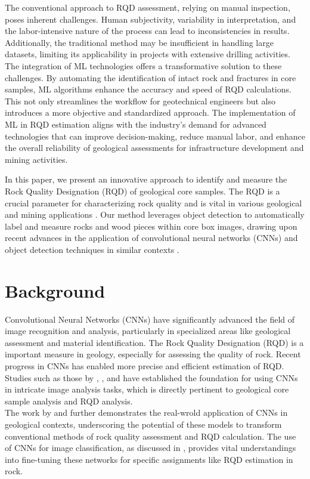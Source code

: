 \documentclass[sigconf,authordraft]{acmart}
\begin{document}
The conventional approach to RQD assessment, relying on manual inspection, poses inherent challenges. Human subjectivity, variability in interpretation, and the labor-intensive nature of the process can lead to inconsistencies in results. Additionally, the traditional method may be insufficient in handling large datasets, limiting its applicability in projects with extensive drilling activities. The integration of ML technologies offers a transformative solution to these challenges. By automating the identification of intact rock and fractures in core samples, ML algorithms enhance the accuracy and speed of RQD calculations. This not only streamlines the workflow for geotechnical engineers but also introduces a more objective and standardized approach. The implementation of ML in RQD estimation aligns with the industry's demand for advanced technologies that can improve decision-making, reduce manual labor, and enhance the overall reliability of geological assessments for infrastructure development and mining activities.

In this paper, we present an innovative approach to identify and measure the Rock Quality Designation (RQD) of geological core samples. The RQD is a crucial parameter for characterizing rock quality and is vital in various geological and mining applications \cite{1,2,7}. Our method leverages object detection to automatically label and measure rocks and wood pieces within core box images, drawing upon recent advances in the application of convolutional neural networks (CNNs) and object detection techniques in similar contexts \cite{1,3,20}.




\section{Background}
Convolutional Neural Networks (CNNs) have significantly advanced the field of image recognition and analysis, particularly in specialized areas like geological assessment and material identification. The Rock Quality Designation (RQD) is a important measure in geology, especially for assessing the quality of rock. Recent progress in CNNs has enabled more precise and efficient estimation of RQD. Studies such as those by \cite{4}, \cite{5}, and \cite{6} have established the foundation for using CNNs in intricate image analysis tasks, which is directly pertinent to geological core sample analysis and RQD analysis. \\

The work by \cite{7} and \cite{8} further demonstrates the real-wrold application of CNNs in geological contexts, underscoring the potential of these models to transform conventional methods of rock quality assessment and RQD calculation. The use of CNNs for image classification, as discussed in \cite{9}, provides vital understandings into fine-tuning these networks for specific assignments like RQD estimation in rock. \\
\end{document}
